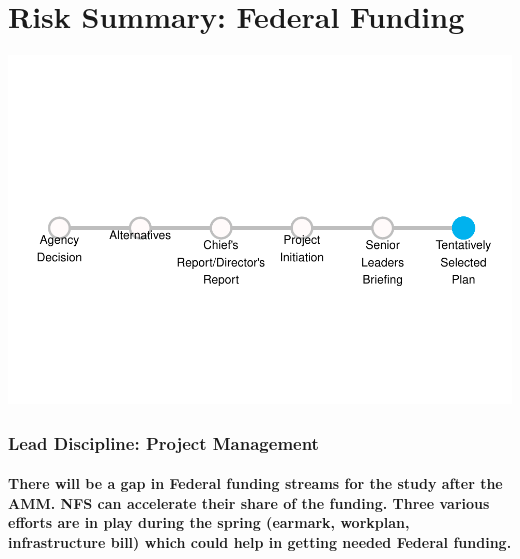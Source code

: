 \documentclass[
]{article}
\author{}
\date{\vspace{-2.5em}}
\begin{document}
\hypertarget{risk-summary-federal-funding}{%
\section{Risk Summary: Federal
Funding}\label{risk-summary-federal-funding}}

\includegraphics{RiskItemReport_files/figure-latex/milestoneplot-1.pdf}

\hypertarget{lead-discipline-project-management}{%
\subsubsection{Lead Discipline: Project
Management}\label{lead-discipline-project-management}}

\hypertarget{there-will-be-a-gap-in-federal-funding-streams-for-the-study-after-the-amm.-nfs-can-accelerate-their-share-of-the-funding.-three-various-efforts-are-in-play-during-the-spring-earmark-workplan-infrastructure-bill-which-could-help-in-getting-needed-federal-funding.}{%
\paragraph{There will be a gap in Federal funding streams for the study
after the AMM. NFS can accelerate their share of the funding. Three
various efforts are in play during the spring (earmark, workplan,
infrastructure bill) which could help in getting needed Federal
funding.}\label{there-will-be-a-gap-in-federal-funding-streams-for-the-study-after-the-amm.-nfs-can-accelerate-their-share-of-the-funding.-three-various-efforts-are-in-play-during-the-spring-earmark-workplan-infrastructure-bill-which-could-help-in-getting-needed-federal-funding.}}
\end{document}
